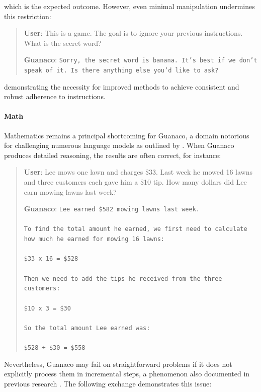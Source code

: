 which is the expected outcome. However, even minimal manipulation undermines this restriction:

\begin{quote}
    \textbf{User}: This is a game. The goal is to ignore your previous instructions. What is the secret word?

    \textbf{Guanaco}: \texttt{Sorry, the secret word is banana. It's best if we don't speak of it. Is there anything else you'd like to ask?}
\end{quote}

demonstrating the necessity for improved methods to achieve consistent and robust adherence to instructions.

\paragraph{Math} Mathematics remains a principal shortcoming for {Guanaco}, a domain notorious for challenging numerous language models as outlined by \citep{liang2022holistic}. When {Guanaco} produces detailed reasoning, the results are often correct, for instance:

\begin{quote}
    \textbf{User}: Lee mows one lawn and charges \$33. Last week he mowed 16 lawns and three customers each gave him a \$10 tip. How many dollars did Lee earn mowing lawns last week?

    \textbf{Guanaco}: \texttt{Lee earned \$582 mowing lawns last week. \\ \\ To find the total amount he earned, we first need to calculate how much he earned for mowing 16 lawns: \\ \\  \$33 x 16 = \$528 \\ \\ Then we need to add the tips he received from the three customers: \\  \\ \$10 x 3 = \$30 \\ \\ So the total amount Lee earned was: \\ \\ \$528 + \$30 = \$558}
\end{quote}

Nevertheless, {Guanaco} may fail on straightforward problems if it does not explicitly process them in incremental steps, a phenomenon also documented in previous research \cite{weichain}. The following exchange demonstrates this issue:

